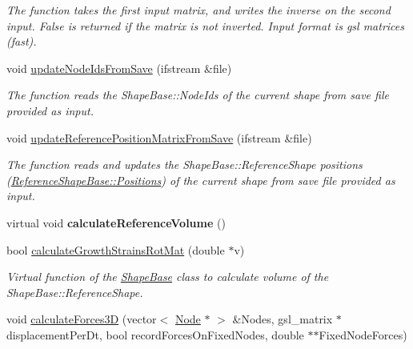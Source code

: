 \begin{DoxyCompactItemize}
\begin{DoxyCompactList}\small\item\em The function takes the first input matrix, and writes the inverse on the second input. False is returned if the matrix is not inverted. Input format is gsl matrices (fast). \end{DoxyCompactList}\item 
\hypertarget{classShapeBase_ac4c46ba7c9b89a208fafb419097494a5}{}void \hyperlink{classShapeBase_ac4c46ba7c9b89a208fafb419097494a5}{update\+Node\+Ids\+From\+Save} (ifstream \&file)\label{classShapeBase_ac4c46ba7c9b89a208fafb419097494a5}

\begin{DoxyCompactList}\small\item\em The function reads the Shape\+Base\+::\+Node\+Ids of the current shape from save file provided as input. \end{DoxyCompactList}\item 
\hypertarget{classShapeBase_a4b5cade90773535353e9b7c4da3463ae}{}void \hyperlink{classShapeBase_a4b5cade90773535353e9b7c4da3463ae}{update\+Reference\+Position\+Matrix\+From\+Save} (ifstream \&file)\label{classShapeBase_a4b5cade90773535353e9b7c4da3463ae}

\begin{DoxyCompactList}\small\item\em The function reads and updates the Shape\+Base\+::\+Reference\+Shape positions (\hyperlink{classReferenceShapeBase_a745e71ff73ef758708f39a4b3b1be4d1}{Reference\+Shape\+Base\+::\+Positions}) of the current shape from save file provided as input. \end{DoxyCompactList}\item 
\hypertarget{classShapeBase_a39adc8589779388b57622489f370f445}{}virtual void {\bfseries calculate\+Reference\+Volume} ()\label{classShapeBase_a39adc8589779388b57622489f370f445}

\item 
bool \hyperlink{classShapeBase_a8bf9c7c8ae6a3195ec9c6b6bdaf847ab}{calculate\+Growth\+Strains\+Rot\+Mat} (double $\ast$v)
\begin{DoxyCompactList}\small\item\em Virtual function of the \hyperlink{classShapeBase}{Shape\+Base} class to calculate volume of the Shape\+Base\+::\+Reference\+Shape. \end{DoxyCompactList}\item 
\hypertarget{classShapeBase_a2b2223ed65a766c8c90fdf470a3bb93e}{}void \hyperlink{classShapeBase_a2b2223ed65a766c8c90fdf470a3bb93e}{calculate\+Forces3\+D} (vector$<$ \hyperlink{classNode}{Node} $\ast$ $>$ \&Nodes, gsl\+\_\+matrix $\ast$displacement\+Per\+Dt, bool record\+Forces\+On\+Fixed\+Nodes, double $\ast$$\ast$Fixed\+Node\+Forces)\label{classShapeBase_a2b2223ed65a766c8c90fdf470a3bb93e}


\end{DoxyCompactItemize}
